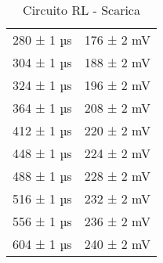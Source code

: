 \documentclass[a4paper]{article}
\begin{document}
\begin{table}[htbp]
\begin{tabular}{|c|c|}
        280 ± 1 µs & 176 ± 2 mV \\
        304 ± 1 µs & 188 ± 2 mV \\
        324 ± 1 µs & 196 ± 2 mV \\
        364 ± 1 µs & 208 ± 2 mV \\
        412 ± 1 µs & 220 ± 2 mV \\
        448 ± 1 µs & 224 ± 2 mV \\
        488 ± 1 µs & 228 ± 2 mV \\
        516 ± 1 µs & 232 ± 2 mV \\
        556 ± 1 µs & 236 ± 2 mV \\
        604 ± 1 µs & 240 ± 2 mV \\
        \hline
        \end{tabular}
        \caption{Circuito RL - Scarica}
        \end{table}
\end{document}
